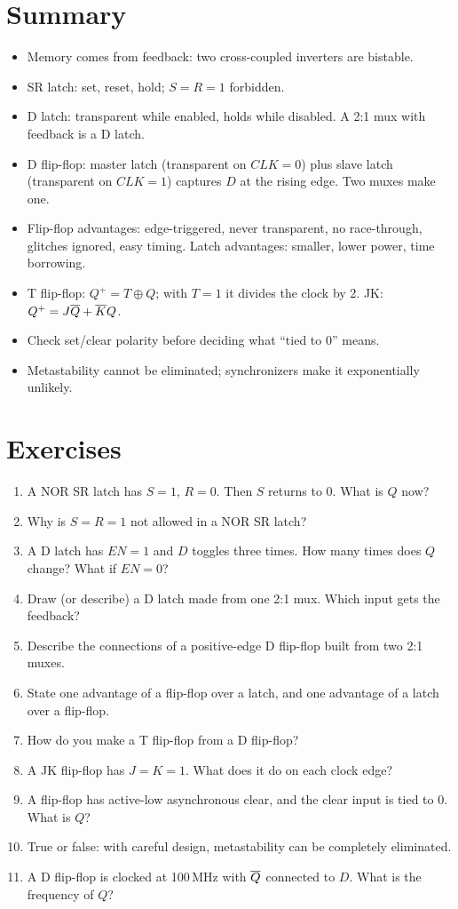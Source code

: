 \section{Summary}

\begin{itemize}
  \item Memory comes from feedback: two cross-coupled inverters are bistable.
  \item SR latch: set, reset, hold; $S = R = 1$ forbidden.
  \item D latch: transparent while enabled, holds while disabled. A 2:1 mux with feedback is a D latch.
  \item D flip-flop: master latch (transparent on $CLK = 0$) plus slave latch (transparent on $CLK = 1$) captures $D$ at the rising edge. Two muxes make one.
  \item Flip-flop advantages: edge-triggered, never transparent, no race-through, glitches ignored, easy timing. Latch advantages: smaller, lower power, time borrowing.
  \item T flip-flop: $Q^+ = T \oplus Q$; with $T = 1$ it divides the clock by 2. JK: $Q^+ = J\overline{Q} + \overline{K}Q$.
  \item Check set/clear polarity before deciding what ``tied to 0'' means.
  \item Metastability cannot be eliminated; synchronizers make it exponentially unlikely.
\end{itemize}

\section{Exercises}

\begin{enumerate}
  \item A NOR SR latch has $S = 1$, $R = 0$. Then $S$ returns to 0. What is $Q$ now?
  \item Why is $S = R = 1$ not allowed in a NOR SR latch?
  \item A D latch has $EN = 1$ and $D$ toggles three times. How many times does $Q$ change? What if $EN = 0$?
  \item Draw (or describe) a D latch made from one 2:1 mux. Which input gets the feedback?
  \item Describe the connections of a positive-edge D flip-flop built from two 2:1 muxes.
  \item State one advantage of a flip-flop over a latch, and one advantage of a latch over a flip-flop.
  \item How do you make a T flip-flop from a D flip-flop?
  \item A JK flip-flop has $J = K = 1$. What does it do on each clock edge?
  \item A flip-flop has active-low asynchronous clear, and the clear input is tied to 0. What is $Q$?
  \item True or false: with careful design, metastability can be completely eliminated.
  \item A D flip-flop is clocked at 100\,MHz with $\overline{Q}$ connected to $D$. What is the frequency of $Q$?
\end{enumerate}

